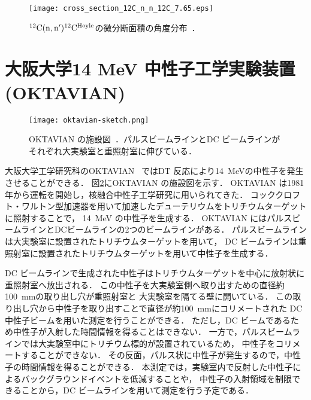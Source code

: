 \documentclass[../master]{subfiles}
\begin{document}
\begin{figure}
  \centering
  \texttt{[image: cross\_section\_12C\_n\_n\_12C\_7.65.eps]}
  \caption[${}^{12}{\rm C}({\rm n},{\rm n}'){}^{12}{\rm C}^{\rm Hoyle}$の微分断面積の角度分布．]
          {${}^{12}{\rm C}({\rm n},{\rm n}'){}^{12}{\rm C}^{\rm Hoyle}$の微分断面積の角度分布~\cite{kondoetal}．}
  \label{fig::sig_angle_dist}
\end{figure}

\section{大阪大学14 MeV 中性子工学実験装置 (OKTAVIAN)}
\begin{figure}
  \centering
  \texttt{[image: oktavian-sketch.png]}
  \caption[OKTAVIAN の施設図．]
          {OKTAVIAN の施設図~\cite{oktavian}．パルスビームラインとDC ビームラインがそれぞれ大実験室と重照射室に伸びている．}
  \label{pic::oktavian-sketch}
\end{figure}
大阪大学工学研究科のOKTAVIAN~\cite{oktavian} ではDT 反応により\SI{14}{\mega\electronvolt}の中性子を発生させることができる．
図\ref{pic::oktavian-sketch}にOKTAVIAN の施設図を示す．
OKTAVIAN は1981年から運転を開始し，核融合中性子工学研究に用いられてきた．
コッククロフト・ワルトン型加速器を用いて加速したデューテリウムをトリチウムターゲットに照射することで，
\SI{14}{\mega\electronvolt} の中性子を生成する．
OKTAVIAN にはパルスビームラインとDCビームラインの2つのビームラインがある．
パルスビームラインは大実験室に設置されたトリチウムターゲットを用いて，
DC ビームラインは重照射室に設置されたトリチウムターゲットを用いて中性子を生成する．

DC ビームラインで生成された中性子はトリチウムターゲットを中心に放射状に重照射室へ放出される．
この中性子を大実験室側へ取り出すための直径約\SI{100}{\milli\metre}の取り出し穴が重照射室と
大実験室を隔てる壁に開いている．
この取り出し穴から中性子を取り出すことで直径が約\SI{100}{\milli\metre}にコリメートされた
DC 中性子ビームを用いた測定を行うことができる．
ただし，DC ビームであるため中性子が入射した時間情報を得ることはできない．
一方で，パルスビームラインでは大実験室中にトリチウム標的が設置されているため，
中性子をコリメートすることができない．
その反面，パルス状に中性子が発生するので，中性子の時間情報を得ることができる．
本測定では，実験室内で反射した中性子によるバックグラウンドイベントを低減することや，
中性子の入射領域を制限できることから，DC ビームラインを用いて測定を行う予定である．
\end{document}
